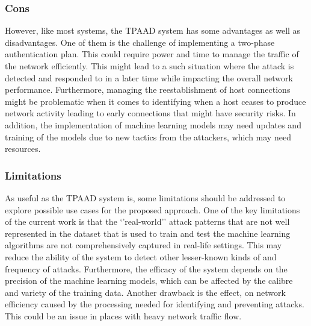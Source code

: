 \documentclass[a4paper, 12pt]{article}
\begin{document}
\subsubsection{Cons}
However, like most systems, the TPAAD system has some advantages as well as disadvantages. One of them is the challenge of implementing a two-phase authentication plan. This could require power and time to manage the traffic of the network efficiently. This might lead to a such situation where the attack is detected and responded to in a later time while impacting the overall network performance. Furthermore, managing the reestablishment of host connections might be problematic when it comes to identifying when a host ceases to produce network activity leading to early connections that might have security risks. In addition, the implementation of machine learning models may need updates and training of the models due to new tactics from the attackers, which may need resources.
\subsubsection{Limitations}
As useful as the TPAAD system is, some limitations should be addressed to explore possible use cases for the proposed approach. One of the key limitations of the current work is that the ‘’real-world’’ attack patterns that are not well represented in the dataset that is used to train and test the machine learning algorithms are not comprehensively captured in real-life settings. This may reduce the ability of the system to detect other lesser-known kinds of and frequency of attacks. Furthermore, the efficacy of the system depends on the precision of the machine learning models, which can be affected by the calibre and variety of the training data. Another drawback is the effect, on network efficiency caused by the processing needed for identifying and preventing attacks. This could be an issue in places with heavy network traffic flow.
\end{document}
